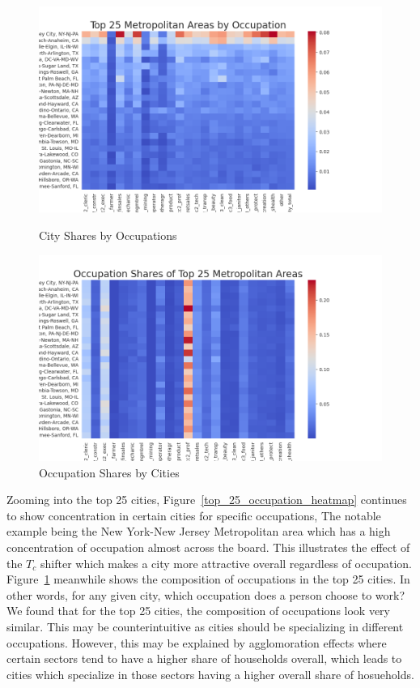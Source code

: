 \documentclass[10pt]{article}
\begin{document}
\begin{figure}[!htb]
    \begin{minipage}{0.5\textwidth}
        \centering
        \includegraphics[width=\textwidth]{../../estimations/graphs/top_25_occupation_heatmap.png}
        \caption{City Shares by Occupations}
        \label{top_25_occupation_heatmap}
    \end{minipage}
    \begin{minipage}{0.5\textwidth}
        \centering
        \includegraphics[width=\textwidth]{../../estimations/graphs/top_25_city_heatmap.png}
        \caption{Occupation Shares by Cities}
        \label{top_25_city_heatmap}
    \end{minipage}
\end{figure}

Zooming into the top 25 cities, Figure~\ref{top_25_occupation_heatmap} continues to show concentration in certain cities for specific occupations, The notable example being the New York-New Jersey Metropolitan area which has a high concentration of occupation almost across the board. This illustrates the effect of the $T_c$ shifter which makes a city more attractive overall regardless of occupation. Figure~\ref{top_25_city_heatmap} meanwhile shows the composition of occupations in the top 25 cities. In other words, for any given city, which occupation does a person choose to work? We found that for the top 25 cities, the composition of occupations look very similar. This may be counterintuitive as cities should be specializing in different occupations. However, this may be explained by agglomoration effects where certain sectors tend to have a higher share of households overall, which leads to cities which specialize in those sectors having a higher overall share of hosueholds.
\end{document}
